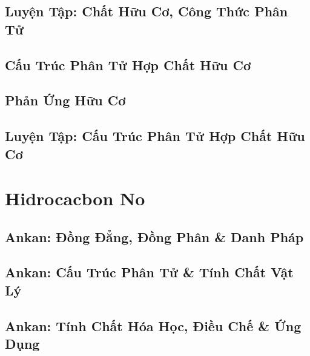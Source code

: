 \documentclass[oneside]{book}
\numberwithin{equation}{section}
\begin{document}

\section{Luyện Tập: Chất Hữu Cơ, Công Thức Phân Tử}


\section{Cấu Trúc Phân Tử Hợp Chất Hữu Cơ}


\section{Phản Ứng Hữu Cơ}


\section{Luyện Tập: Cấu Trúc Phân Tử Hợp Chất Hữu Cơ}


\chapter{Hidrocacbon No}

\section{Ankan: Đồng Đẳng, Đồng Phân \& Danh Pháp}


\section{Ankan: Cấu Trúc Phân Tử \& Tính Chất Vật Lý}


\section{Ankan: Tính Chất Hóa Học, Điều Chế \& Ứng Dụng}
\end{document}
